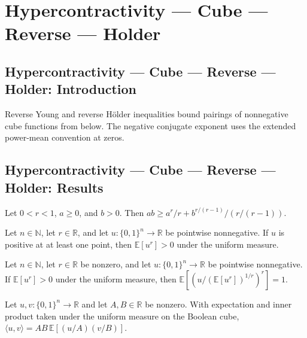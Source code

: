 \section{Hypercontractivity --- Cube --- Reverse --- Holder}
\subsection*{Hypercontractivity --- Cube --- Reverse --- Holder: Introduction}
Reverse Young and reverse Hölder inequalities bound pairings of nonnegative cube functions from below. The negative conjugate exponent uses the extended power-mean convention at zeros.

\subsection*{Hypercontractivity --- Cube --- Reverse --- Holder: Results}

\begin{lemma}
\leanok
{}
Let $0<r<1$, $a\ge0$, and $b>0$. Then $ab\ge a^r/r+b^{r/(r-1)}/(r/(r-1))$.
\end{lemma}

\begin{lemma}
\leanok
{}
Let $n\in\mathbb N$, let $r\in\mathbb R$, and let $u:\{0,1\}^n\to\mathbb R$ be pointwise
nonnegative. If $u$ is positive at at least one point, then $\mathbb E[u^r]>0$ under the
uniform measure.
\end{lemma}

\begin{lemma}
\leanok
{}
Let $n\in\mathbb N$, let $r\in\mathbb R$ be nonzero, and let $u:\{0,1\}^n\to\mathbb R$
be pointwise nonnegative. If $\mathbb E[u^r]>0$ under the uniform measure, then $\mathbb
E\!\left[\left(u/(\mathbb E[u^r])^{1/r}\right)^r\right]=1$.
\end{lemma}

\begin{lemma}
\leanok
{}
Let $u,v:\{0,1\}^n\to\mathbb R$ and let $A,B\in\mathbb R$ be nonzero. With expectation
and inner product taken under the uniform measure on the Boolean cube, $\langle
u,v\rangle=AB\,\mathbb E[(u/A)(v/B)]$.
\end{lemma}

